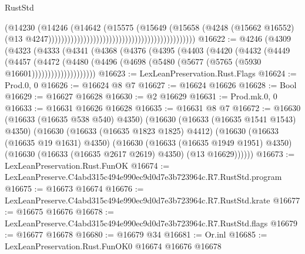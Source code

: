 \begin{lexlean}{RustStd}
\begin{coremodule}
                                                                                (@14230
                                                                                  (@14246
                                                                                    (@14642
                                                                                      (@15575
                                                                                        (@15649
                                                                                          (@15658
                                                                                            (@4248
                                                                                              (@15662
                                                                                                @16552)
                                                                                              (@13
                                                                                                @4247))))))))))))))))))))))))))))))))))))))))))))))
@16622 := @4246
    (@4309
      (@4323
        (@4333
          (@4341
            (@4368
              (@4376
                (@4395
                  (@4403
                    (@4420
                      (@4432
                        (@4449
                          (@4457
                            (@4472
                              (@4480
                                (@4496 (@4698 (@5480 (@5677 (@5765 (@5930 @16601))))))))))))))))))))
@16623 := LexLeanPreservation.Rust.Flags
@16624 := Prod.{0, 0}
@16626 := @16624 @8 @7
@16627 := @16624 @16626
@16628 := Bool
@16629 := @16627 @16628
@16630 := @2 @16629
@16631 := Prod.mk.{0, 0}
@16633 := @16631 @16626 @16628
@16635 := @16631 @8 @7
@16672 := @16630
    (@16633 (@16635 @538 @540) @4350)
    (@16630
      (@16633 (@16635 @1541 @1543) @4350)
      (@16630
        (@16633 (@16635 @1823 @1825) @4412)
        (@16630
          (@16633 (@16635 @19 @1631) @4350)
          (@16630
            (@16633 (@16635 @1949 @1951) @4350)
            (@16630 (@16633 (@16635 @2617 @2619) @4350) (@13 @16629))))))
@16673 := LexLeanPreservation.Rust.FunOK
@16674 := LexLeanPreserve.C4abd315c494e990ec9d0d7e3b723964c.R7.RustStd.program
@16675 := @16673 @16674
@16676 := LexLeanPreserve.C4abd315c494e990ec9d0d7e3b723964c.R7.RustStd.krate
@16677 := @16675 @16676
@16678 := LexLeanPreserve.C4abd315c494e990ec9d0d7e3b723964c.R7.RustStd.flags
@16679 := @16677 @16678
@16680 := @16679 @34
@16681 := Or.inl
@16685 := LexLeanPreservation.Rust.FunOK0 @16674 @16676 @16678

\end{coremodule}
\end{lexlean}
